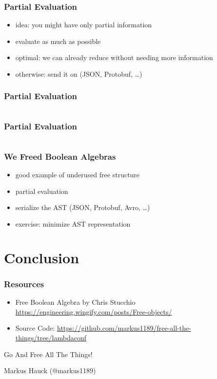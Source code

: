 \documentclass{beamer}
\begin{document}
\begin{frame}
  \frametitle{Partial Evaluation}
  \begin{itemize}
  \item idea: you might have only partial information
  \item evaluate as much as possible
  \item optimal: we can already reduce without needing more information
  \item otherwise: send it on (JSON, Protobuf, \ldots{})
  \end{itemize}
\end{frame}

\begin{frame}
  \frametitle{Partial Evaluation}
  \inputminted{scala}{snippets/partial-evaluator.scala}
\end{frame}

\begin{frame}
  \frametitle{Partial Evaluation}
  \inputminted{scala}{snippets/partially.scala}
\end{frame}

\begin{frame}
  \frametitle{We Freed Boolean Algebras}
  \begin{itemize}
  \item good example of underused free structure
  \item partial evaluation
  \item serialize the AST (JSON, Protobuf, Avro, \ldots{})
  \item exercise: minimize AST representation
  \end{itemize}
\end{frame}

\section{Conclusion}\label{sec:conclusion}

\begin{frame}
  \frametitle{Resources}
  \begin{itemize}
  \item Free Boolean Algebra by Chris Stucchio \url{https://engineering.wingify.com/posts/Free-objects/}
  \item Source Code: \url{https://github.com/markus1189/free-all-the-things/tree/lambdaconf}
  \end{itemize}
\end{frame}

\begin{frame}
  \begin{center}
    \Huge
    Go And Free All The Things!
  \end{center}
  \begin{center}
    Markus Hauck (@markus1189)
  \end{center}
\end{frame}
\end{document}
